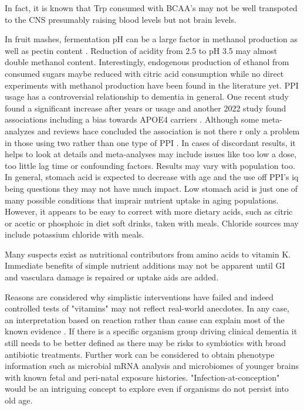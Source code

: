 \documentclass[aps,secnumarabic,balancelastpage,amsmath,amssymb,nofootinbib]{revtex4}
\begin{document}
In fact, it is known that Trp consumed with BCAA's may not be well transpoted
to the CNS presumably raising blood levels but not brain levels. 

In fruit mashes, fermentation pH can be a large factor in methanol
production as well as pectin content 
\cite{Blumenthal_Steger_Einfalt_Methanol_Mitigation_during_Manufacturing_2021}.
Reduction of acidity from 2.5 to pH 3.5 may almost double
methanol content. 
Interestingly, endogenous production of ethanol from consumed
sugars maybe reduced with citric acid consumption 
\cite{10.3389/fmicb.2016.00047} while no direct experiments
with methanol production have been found in the literature yet.
PPI usage has a controversial relationship to dementia
in general. 
One recent study found a significant increase after years or usage
\cite{Northuis10.1212/WNL.0000000000207747}
and another 2022 study found associations
including a  bias towards APOE4 carriers
\cite{Zhang_Li_Chen_Regular_proton_pump_inhibitor_2022}.
Although some meta-analyzes and reviews hace concluded the association is
not there 
\cite{PMC10229084}
r only a problem in those using two rather than one type of PPI
\cite{TorresBondia_Dakterzada_Galvan_Proton_pump_inhibitors_2020}.
In cases of discordant results, it helps to look at details and meta-analyses
may include issues like too low a dose, too little lag time or 
confounding factors. Results may vary with population too.
In general, stomach acid is expected to decrease with age
and the use off PPI's iq being questions \cite{Mehta_Guasch_Kamen_Proton_Pump_Inhibitors_2020} they may not have much impact. 
Low stomach acid is just one of many possible conditions
that imprair nutrient uptake in aging populations.
However, it appears to be easy to correct with more
dietary acids, such as citric or acetic or phosphoic in diet
soft drinks, taken   with meals.
Chloride sources may include potassium chloride with meals.

Many suspects
exist as nutritional contributors from amino acids to vitamin K. 
Immediate benefits of simple nutrient additions may
not be apparent until GI and vasculara damage is repaired
or uptake aids are added. 

Reasons are considered why simplistic
interventions have failed and indeed controlled tests
of "vitamins" may not reflect real-world anecdotes.
In any case, an interpretation based on reaction rather
than cause can explain most of the known evidence 
. If there is a specific organism group driving clinical
dementia it still needs to be better defined 
as there may be risks to symbiotics with broad antibiotic treatments. 
Further work can be considered to obtain phenotype information
such as microbial mRNA analysis and microbiomes of
younger brains with known fetal and peri-natal exposure histories.  
"Infection-at-conception" would be an intriguing concept to explore
even if organisms do not persist into old age. 
\end{document}
